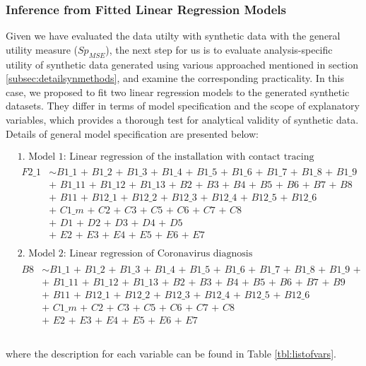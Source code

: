 \subsubsection{Inference from Fitted Linear Regression Models}
\label{subsubsec:inferencelm}
Given we have evaluated the data utilty with synthetic data with the general utility measure ($Sp_{MSE}$), the next step for us is to evaluate analysis-specific utility of synthetic data generated using various approached mentioned in section \ref{subsec:detailsynmethods}, and examine the corresponding practicality. In this case, we proposed to fit two linear regression models to the generated synthetic datasets. They differ in terms of model specification and the scope of explanatory variables, which provides a thorough test for analytical validity of synthetic data. Details of general model specification are presented below:
\begin{fleqn}
\begin{align*}
& \text{1. Model 1: Linear regression of the installation with contact tracing application} \\
& \begin{aligned}
  \textit{F2\_1} &\sim \textit{B1\_1 + B1\_2 + B1\_3 + B1\_4 + B1\_5 + B1\_6 + B1\_7 + B1\_8 + B1\_9 + B1\_10}\\
  &\textit{+ B1\_11 + B1\_12 + B1\_13 + B2 + B3 + B4 + B5 + B6 + B7 + B8 + B9 + B10}\\
  &\textit{+ B11 + B12\_1 + B12\_2 + B12\_3 + B12\_4 + B12\_5 + B12\_6}\\
  &\textit{+ C1\_m + C2 + C3 + C5 + C6 + C7 + C8}\\
  &\textit{+ D1 + D2 + D3 + D4 + D5}\\
  &\textit{+ E2 + E3 + E4 + E5 + E6 + E7}\\
  \end{aligned} \\
& \text{2. Model 2: Linear regression of Coronavirus diagnosis} \\
& \begin{aligned}
  \textit{B8} &\sim \textit{B1\_1 + B1\_2 + B1\_3 + B1\_4 + B1\_5 + B1\_6 + B1\_7 + B1\_8 + B1\_9 + B1\_10}\\
  &\textit{+ B1\_11 + B1\_12 + B1\_13 + B2 + B3 + B4 + B5 + B6 + B7 + B9 + B10}\\
  &\textit{+ B11 + B12\_1 + B12\_2 + B12\_3 + B12\_4 + B12\_5 + B12\_6}\\
  &\textit{+ C1\_m + C2 + C3 + C5 + C6 + C7 + C8}\\
  &\textit{+ E2 + E3 + E4 + E5 + E6 + E7}\\
  \end{aligned} \\
\end{align*}
\end{fleqn}
where the description for each variable can be found in Table \ref{tbl:listofvars}. 

